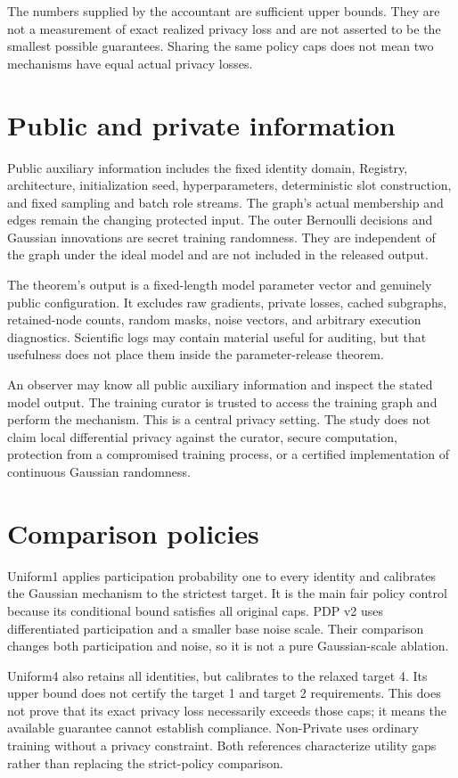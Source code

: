 The numbers supplied by the accountant are sufficient upper bounds. They are not a measurement of exact realized privacy loss and are not asserted to be the smallest possible guarantees. Sharing the same policy caps does not mean two mechanisms have equal actual privacy losses.

\section{Public and private information}
Public auxiliary information includes the fixed identity domain, Registry, architecture, initialization seed, hyperparameters, deterministic slot construction, and fixed sampling and batch role streams. The graph's actual membership and edges remain the changing protected input. The outer Bernoulli decisions and Gaussian innovations are secret training randomness. They are independent of the graph under the ideal model and are not included in the released output.

The theorem's output is a fixed-length model parameter vector and genuinely public configuration. It excludes raw gradients, private losses, cached subgraphs, retained-node counts, random masks, noise vectors, and arbitrary execution diagnostics. Scientific logs may contain material useful for auditing, but that usefulness does not place them inside the parameter-release theorem.

An observer may know all public auxiliary information and inspect the stated model output. The training curator is trusted to access the training graph and perform the mechanism. This is a central privacy setting. The study does not claim local differential privacy against the curator, secure computation, protection from a compromised training process, or a certified implementation of continuous Gaussian randomness.

\section{Comparison policies}
Uniform1 applies participation probability one to every identity and calibrates the Gaussian mechanism to the strictest target. It is the main fair policy control because its conditional bound satisfies all original caps. PDP v2 uses differentiated participation and a smaller base noise scale. Their comparison changes both participation and noise, so it is not a pure Gaussian-scale ablation.

Uniform4 also retains all identities, but calibrates to the relaxed target 4. Its upper bound does not certify the target 1 and target 2 requirements. This does not prove that its exact privacy loss necessarily exceeds those caps; it means the available guarantee cannot establish compliance. Non-Private uses ordinary training without a privacy constraint. Both references characterize utility gaps rather than replacing the strict-policy comparison.

